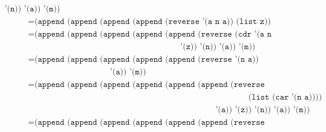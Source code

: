 \documentclass[letterpaper,11pt]{article}
\begin{document}
\begin{enumerate}
\begin{enumerate}
\begin{align*}
              \; \; \; \; \; \; \; \; \; \; \; \; \; \; \; \; \; \; \; \; \; \; \;
              \; \; \; \;  
                                               \texttt{'(n)) '(a)) '(m))} \\
            &= \texttt{(append (append (append (append (reverse '(a n a)) (list z)) '(n)) '(a)) '(m))} \\
            &= \texttt{(append (append (append (append (append (reverse (cdr '(a n a))) (list (car '(a n a))))} \\
            & \; \; \; \; \; \; \; \; \; \; \; \; \; \; \; \; \; \; \; \; \; \; \;
              \; \; \; \; \; \; \; \; \; \; \; \; \; \; \; \; \; \; \; \; \; \; \;
              \; \; \; \; \; \; \; \; \; \; \; \; \; \; \; \; \; \; \; 
                                                       \texttt{'(z)) '(n)) '(a)) '(m))} \\
            &= \texttt{(append (append (append (append (append (reverse '(n a)) (list a)) '(z)) '(n))} \\ 
            & \; \; \; \; \; \; \; \; \; \; \; \; \; \; \; \; \; \; \; \; \; \; \; 
              \; \; \; \; \; \; \; \; \; \; \; \; 
                                       \texttt{'(a)) '(m))} \\ 
            &= \texttt{(append (append (append (append (append (append (reverse (cdr '(n a)))} \\ 
            & \; \; \; \; \; \; \; \; \; \; \; \; \; \; \; \; \; \; \; \; \; \; \;
              \; \; \; \; \; \; \; \; \; \; \; \; \; \; \; \; \; \; \; \; \; \; \;
              \; \; \; \; \; \; \; \; \; \; \; \; \; \; \; \; \; \; \; \; \; \; \;
              \; \; \; \; \; \; \; \; \; \; \; \; \; \; \; \; \; \; \; \; \; \; \;
              \; \;
                                                                       \texttt{(list (car '(n a))))} \\
            & \; \; \; \; \; \; \; \; \; \; \; \; \; \; \; \; \; \; \; \; \; \; \;
              \; \; \; \; \; \; \; \; \; \; \; \; \; \; \; \; \; \; \; \; \; \; \;
              \; \; \; \; \; \; \; \; \; \; \; \; \; \; \; \; \; \; \; \; \; \; \;
              \; \; \; \; \; \; \; \; \; \; \;
                                                               \texttt{'(a)) '(z)) '(n)) '(a)) '(m))} \\
            &= \texttt{(append (append (append (append (append (append (reverse '(a)) (list n))} \\
            & \; \; \; \; \; \; \; \; \; \; \; \; \; \; \; \; \; \; \; \; \; \; \;
              \; \; \; \; \; \; \; \; \; \; \; \; \; \; \; \; \; \; \; \; \; \; \;

\end{align*}
\end{enumerate}
\end{enumerate}
\end{document}
